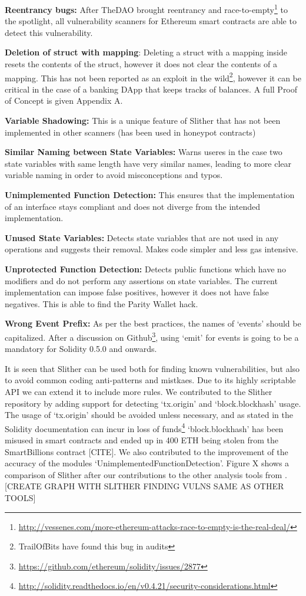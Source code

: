 \textbf{Reentrancy bugs:} After TheDAO brought reentrancy and race-to-empty\footnote{\url{http://vessenes.com/more-ethereum-attacks-race-to-empty-is-the-real-deal/}} to the spotlight, all vulnerability scanners for Ethereum smart contracts are able to detect this vulnerability.

\textbf{Deletion of struct with mapping}: Deleting a struct with a mapping inside resets the contents of the struct, however it does not clear the contents of a mapping. This has not been reported as an exploit in the wild\footnote{TrailOfBits have found this bug in audits}, however it can be critical in the case of a banking DApp that keeps tracks of balances. A full Proof of Concept is given Appendix A.

\textbf{Variable Shadowing:} This is a unique feature of Slither that has not been implemented in other scanners (has been used in honeypot contracts)

\textbf{Similar Naming between State Variables:} Warns useres in the case two state variables with same length have very similar names, leading to more clear variable naming in order to avoid misconceptions and typos.

\textbf{Unimplemented Function Detection:} This ensures that the implementation of an interface stays compliant and does not diverge from the intended implementation.

\textbf{Unused State Variables:} Detects state variables that are not used in any operations and suggests their removal. Makes code simpler and less gas intensive.

\textbf{Unprotected Function Detection:} Detects public functions which have no modifiers and do not perform any assertions on state variables. The current implementation can impose false positives, however it does not have false negatives. This is able to find the Parity Wallet hack.

\textbf{Wrong Event Prefix:} As per the best practices, the names of `events' should be capitalized. After a discussion on Github\footnote{\url{https://github.com/ethereum/solidity/issues/2877}}, using `emit' for events is going to be a mandatory for Solidity 0.5.0 and onwards.


It is seen that Slither can be used both for finding known vulnerabilities, but also to avoid common coding anti-patterns and mistkaes. Due to its highly scriptable API we can extend it to include more rules. We contributed to the Slither repository by adding support for detecting `tx.origin' and `block.blockhash' usage. The usage of `tx.origin' should be avoided unless necessary, and as stated in the Solidity documentation can incur in loss of funds\footnote{\url{http://solidity.readthedocs.io/en/v0.4.21/security-considerations.html}} `block.blockhash' has been misused in smart contracts and ended up in 400 ETH being stolen from the SmartBillions contract [CITE]. We also contributed to the improvement of the accuracy of the modules `UnimplementedFunctionDetection'. Figure X shows a comparison of Slither after our contributions to the other analysis tools from \cite{tools}. [CREATE GRAPH WITH SLITHER FINDING VULNS SAME AS OTHER TOOLS]

